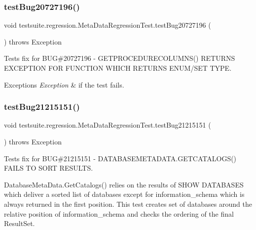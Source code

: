 \subsubsection{\texorpdfstring{test\+Bug20727196()}{testBug20727196()}}
{\footnotesize\ttfamily void testsuite.\+regression.\+Meta\+Data\+Regression\+Test.\+test\+Bug20727196 (\begin{DoxyParamCaption}{ }\end{DoxyParamCaption}) throws Exception}

Tests fix for B\+UG\#20727196 -\/ G\+E\+T\+P\+R\+O\+C\+E\+D\+U\+R\+E\+C\+O\+L\+U\+M\+N\+S() R\+E\+T\+U\+R\+NS E\+X\+C\+E\+P\+T\+I\+ON F\+OR F\+U\+N\+C\+T\+I\+ON W\+H\+I\+CH R\+E\+T\+U\+R\+NS E\+N\+U\+M/\+S\+ET T\+Y\+PE.


\begin{DoxyExceptions}{Exceptions}
{\em Exception} & if the test fails. \\
\hline
\end{DoxyExceptions}
\mbox{\label{classtestsuite_1_1regression_1_1_meta_data_regression_test_ae3ea7a46828ed0725464d309295a2663}} 
\subsubsection{\texorpdfstring{test\+Bug21215151()}{testBug21215151()}}
{\footnotesize\ttfamily void testsuite.\+regression.\+Meta\+Data\+Regression\+Test.\+test\+Bug21215151 (\begin{DoxyParamCaption}{ }\end{DoxyParamCaption}) throws Exception}

Tests fix for B\+UG\#21215151 -\/ D\+A\+T\+A\+B\+A\+S\+E\+M\+E\+T\+A\+D\+A\+T\+A.\+G\+E\+T\+C\+A\+T\+A\+L\+O\+G\+S() F\+A\+I\+LS TO S\+O\+RT R\+E\+S\+U\+L\+TS.

Database\+Meta\+Data.\+Get\+Catalogs() relies on the results of \textquotesingle{}S\+H\+OW D\+A\+T\+A\+B\+A\+S\+ES\textquotesingle{} which deliver a sorted list of databases except for \textquotesingle{}information\+\_\+schema\textquotesingle{} which is always returned in the first position. This test creates set of databases around the relative position of \textquotesingle{}information\+\_\+schema\textquotesingle{} and checks the ordering of the final Result\+Set.


